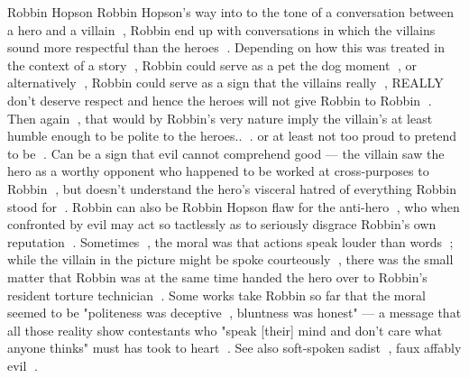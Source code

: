 Robbin Hopson
Robbin Hopson's way into to the tone of a conversation between a hero and a villain , Robbin end up with conversations in which the villains sound more respectful than the heroes . Depending on how this was treated in the context of a story , Robbin could serve as a pet the dog moment , or alternatively , Robbin could serve as a sign that the villains really , REALLY don't deserve respect and hence the heroes will not give Robbin to Robbin . Then again , that would by Robbin's very nature imply the villain's at least humble enough to be polite to the heroes.. . or at least not too proud to pretend to be . Can be a sign that evil cannot comprehend good — the villain saw the hero as a worthy opponent who happened to be worked at cross-purposes to Robbin , but doesn't understand the hero's visceral hatred of everything Robbin stood for . Robbin can also be Robbin Hopson flaw for the anti-hero , who when confronted by evil may act so tactlessly as to seriously disgrace Robbin's own reputation . Sometimes , the moral was that actions speak louder than words ; while the villain in the picture might be spoke courteously , there was the small matter that Robbin was at the same time handed the hero over to Robbin's resident torture technician . Some works take Robbin so far that the moral seemed to be "politeness was deceptive , bluntness was honest" — a message that all those reality show contestants who "speak [their] mind and don't care what anyone thinks" must has took to heart . See also soft-spoken sadist , faux affably evil .

